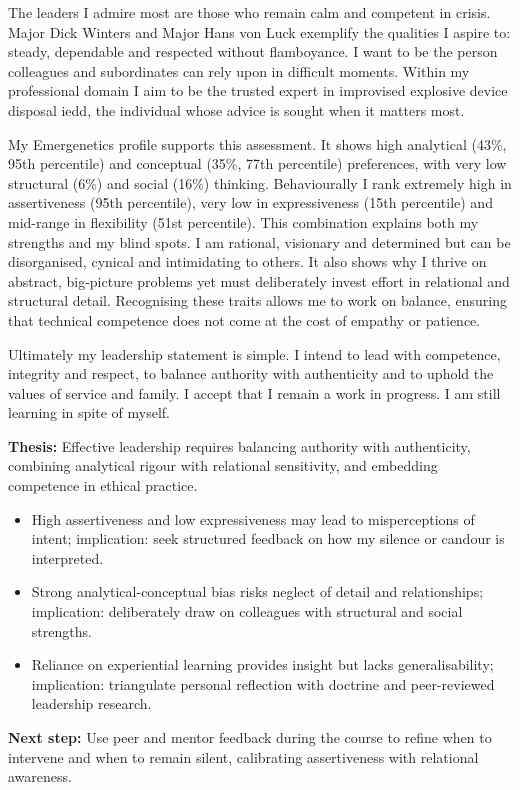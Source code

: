 The leaders I admire most are those who remain calm and competent in crisis. Major Dick Winters and Major Hans von Luck exemplify the qualities I aspire to: steady, dependable and respected without flamboyance. I want to be the person colleagues and subordinates can rely upon in difficult moments. Within my professional domain I aim to be the trusted expert in improvised explosive device disposal \gls{iedd}, the individual whose advice is sought when it matters most.  

My Emergenetics profile supports this assessment. It shows high analytical (43\%, 95th percentile) and conceptual (35\%, 77th percentile) preferences, with very low structural (6\%) and social (16\%) thinking. Behaviourally I rank extremely high in assertiveness (95th percentile), very low in expressiveness (15th percentile) and mid-range in flexibility (51st percentile). This combination explains both my strengths and my blind spots. I am rational, visionary and determined but can be disorganised, cynical and intimidating to others. It also shows why I thrive on abstract, big-picture problems yet must deliberately invest effort in relational and structural detail. Recognising these traits allows me to work on balance, ensuring that technical competence does not come at the cost of empathy or patience.  

Ultimately my leadership statement is simple. I intend to lead with competence, integrity and respect, to balance authority with authenticity and to uphold the values of service and family. I accept that I remain a work in progress. I am still learning in spite of myself.  

\textbf{Thesis:} Effective leadership requires balancing authority with authenticity, combining analytical rigour with relational sensitivity, and embedding competence in ethical practice.  

\begin{itemize}
	\item High assertiveness and low expressiveness may lead to misperceptions of intent; implication: seek structured feedback on how my silence or candour is interpreted.  
	\item Strong analytical-conceptual bias risks neglect of detail and relationships; implication: deliberately draw on colleagues with structural and social strengths.  
	\item Reliance on experiential learning provides insight but lacks generalisability; implication: triangulate personal reflection with doctrine and peer-reviewed leadership research.  
\end{itemize}

\textbf{Next step:} Use peer and mentor feedback during the course to refine when to intervene and when to remain silent, calibrating assertiveness with relational awareness.
